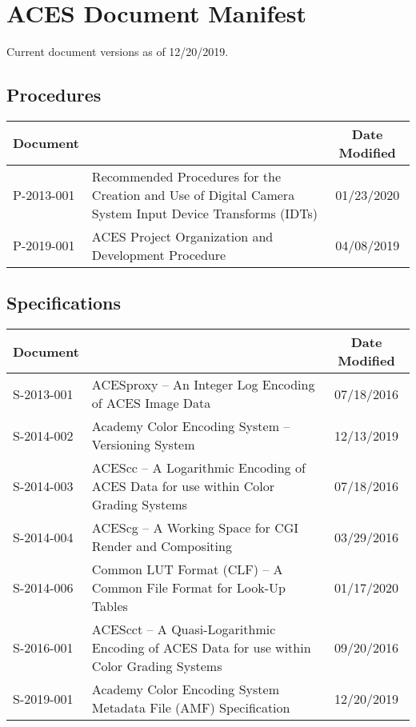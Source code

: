 \documentclass[10pt]{academydoc}
\begin{document}
\regularsectionformat

\section*{ACES Document Manifest}
Current document versions as of 12/20/2019.

\subsection*{Procedures}
\begin{tabularx}{\linewidth}{|l X|c|}
\hline
\textbf{Document} & & \textbf{Date Modified} \\ \hline
P-2013-001 & Recommended Procedures for the Creation and Use of Digital Camera System Input Device Transforms (IDTs) & 01/23/2020 \\ \hline
P-2019-001 & ACES Project Organization and Development Procedure & 04/08/2019 \\ \hline
\end{tabularx}

\subsection*{Specifications}
\begin{tabularx}{\linewidth}{|l X|c|}
\hline
\textbf{Document} & & \textbf{Date Modified} \\ \hline
S-2013-001 & ACESproxy -- An Integer Log Encoding of ACES Image Data & 07/18/2016 \\ \hline
S-2014-002 & Academy Color Encoding System -- Versioning System & 12/13/2019 \\ \hline
S-2014-003 & ACEScc -- A Logarithmic Encoding of ACES Data for use within Color Grading Systems & 07/18/2016 \\ \hline
S-2014-004 & ACEScg -- A Working Space for CGI Render and Compositing & 03/29/2016 \\ \hline
S-2014-006 & Common LUT Format (CLF) -- A Common File Format for Look-Up Tables & 01/17/2020 \\ \hline
S-2016-001 & ACEScct -- A Quasi-Logarithmic Encoding of ACES Data for use within Color Grading Systems & 09/20/2016 \\ \hline
S-2019-001 & Academy Color Encoding System Metadata File (AMF) Specification & 12/20/2019 \\ \hline
\end{tabularx}
\end{document}

